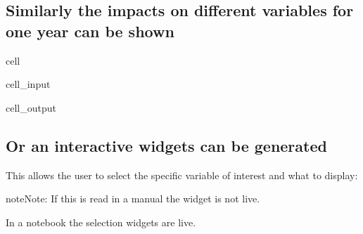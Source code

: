 \documentclass[letterpaper,10pt,english]{jupyterBook}
\begin{document}
\subsection{Similarly the impacts on different variables for one year can be shown}
\label{\detokenize{content/06_ModelAnalytics/AttributionSomeFeatures:similarly-the-impacts-on-different-variables-for-one-year-can-be-shown}}
\begin{sphinxuseclass}{cell}\begin{sphinxVerbatimInput}

\begin{sphinxuseclass}{cell_input}
\begin{sphinxVerbatim}[commandchars=\\\{\}]
  

\end{sphinxVerbatim}

\end{sphinxuseclass}\end{sphinxVerbatimInput}
\begin{sphinxVerbatimOutput}

\begin{sphinxuseclass}{cell_output}
\noindent{}

\end{sphinxuseclass}\end{sphinxVerbatimOutput}

\end{sphinxuseclass}

\subsection{Or an interactive widgets can be generated}
\label{\detokenize{content/06_ModelAnalytics/AttributionSomeFeatures:or-an-interactive-widgets-can-be-generated}}
\sphinxAtStartPar
This allows the user to select the specific variable of interest and what to display:

\begin{sphinxadmonition}{note}{Note:}
\sphinxAtStartPar
If this is read in a manual the widget is not live.

\sphinxAtStartPar
In a notebook the selection widgets are live.
\end{sphinxadmonition}
\end{document}
